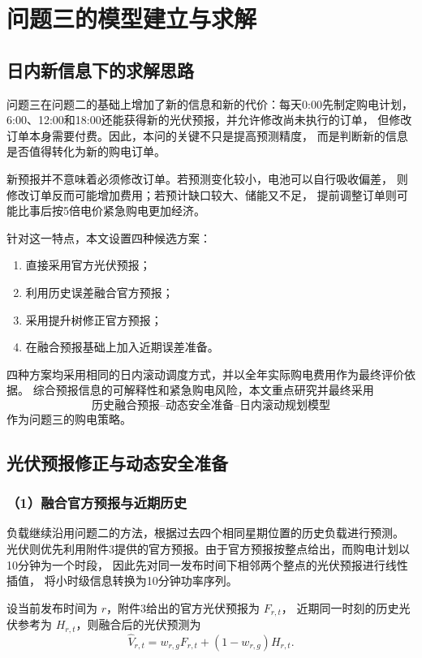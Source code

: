 \section{问题三的模型建立与求解}

\subsection{日内新信息下的求解思路}

问题三在问题二的基础上增加了新的信息和新的代价：每天0:00先制定购电计划，
6:00、12:00和18:00还能获得新的光伏预报，并允许修改尚未执行的订单，
但修改订单本身需要付费。因此，本问的关键不只是提高预测精度，
而是判断新的信息是否值得转化为新的购电订单。

新预报并不意味着必须修改订单。若预测变化较小，电池可以自行吸收偏差，
则修改订单反而可能增加费用；若预计缺口较大、储能又不足，
提前调整订单则可能比事后按5倍电价紧急购电更加经济。

针对这一特点，本文设置四种候选方案：
\begin{enumerate}
    \item 直接采用官方光伏预报；
    \item 利用历史误差融合官方预报；
    \item 采用提升树修正官方预报；
    \item 在融合预报基础上加入近期误差准备。
\end{enumerate}

四种方案均采用相同的日内滚动调度方式，并以全年实际购电费用作为最终评价依据。
综合预报信息的可解释性和紧急购电风险，本文重点研究并最终采用
\[
\boxed{\text{历史融合预报--动态安全准备--日内滚动规划模型}}
\]
作为问题三的购电策略。


\subsection{光伏预报修正与动态安全准备}

\subsubsection*{（1）融合官方预报与近期历史}

负载继续沿用问题二的方法，根据过去四个相同星期位置的历史负载进行预测。
光伏则优先利用附件3提供的官方预报。由于官方预报按整点给出，而购电计划以10分钟为一个时段，
因此先对同一发布时间下相邻两个整点的光伏预报进行线性插值，
将小时级信息转换为10分钟功率序列。

设当前发布时间为 $r$，附件3给出的官方光伏预报为 $F_{r,t}$，
近期同一时刻的历史光伏参考为 $H_{r,t}$，则融合后的光伏预测为
\begin{equation}
\widehat{V}_{r,t}
=
w_{r,g}F_{r,t}
+
(1-w_{r,g})H_{r,t}.
\end{equation}


